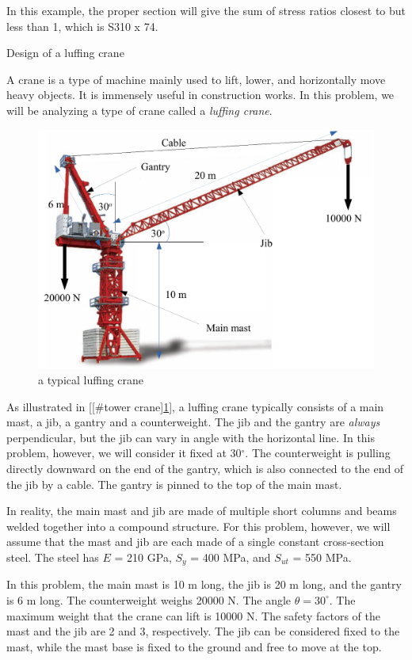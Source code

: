 \documentclass[a4paper,openany,12pt]{book}
\begin{document}
{{\begin{enumerate}
In this example, the proper section will give the sum of stress ratios
closest to but less than 1, which is S310 x 74.

Design of a luffing crane

A crane is a type of machine mainly used to lift, lower, and
horizontally move heavy objects. It is immensely useful in construction
works. In this problem, we will be analyzing a type of crane called a
\emph{luffing crane}.


\begin{figure}[htbp]
\centering
\includegraphics[width=.9\linewidth]{pictures/Simple-load-bearing/tower-crane2.pdf}
\caption{\label{tower crane}
a typical luffing crane}
\end{figure}

As illustrated in [[\#tower crane]\ref{tower crane}], a luffing crane
typically consists of a main mast, a jib, a gantry and a counterweight.
The jib and the gantry are \emph{always} perpendicular, but the jib can vary
in angle with the horizontal line. In this problem, however, we will
consider it fixed at 30\(^{\circ}\). The counterweight is pulling directly
downward on the end of the gantry, which is also connected to the end of
the jib by a cable. The gantry is pinned to the top of the main mast.

In reality, the main mast and jib are made of multiple short columns and
beams welded together into a compound structure. For this problem,
however, we will assume that the mast and jib are each made of a single
constant cross-section steel. The steel has \(E\) = 210 GPa, \(S_y\) = 400
MPa, and \(S_{ut}\) = 550 MPa.

In this problem, the main mast is 10 m long, the jib is 20 m long, and
the gantry is 6 m long. The counterweight weighs 20000 N. The angle
\(\theta = 30^{\circ}\). The maximum weight that the crane can lift is
10000 N. The safety factors of the mast and the jib are 2 and 3,
respectively. The jib can be considered fixed to the mast, while the
mast base is fixed to the ground and free to move at the top.


\end{enumerate}}}
\end{document}
